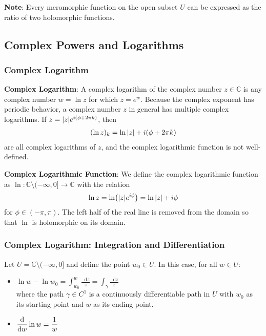 \documentclass[11pt, a4paper]{article}
\newcommand{\diff}{\mathop{}\!\mathrm{d}} %
\newcommand{\C}{\mathbb{C}} %
\begin{document}
\textbf{Note}: Every meromorphic function on the open subset $ U $ can be expressed as the ratio of two holomorphic functions.


\subsection{Complex Powers and Logarithms}

\subsubsection{Complex Logarithm}
\textbf{Complex Logarithm}: A complex logarithm of the complex number $ z \in \C $ is any complex number $ w = \ln z $ for which $ z = e^{w} $. Because the complex exponent has periodic behavior, a complex number $ z $ in general has multiple complex logarithms. If $ z = \abs{z}e^{i(\phi + 2\pi k)} $, then
\begin{align*}
	(\ln z)_k = \ln \abs{z} + i(\phi + 2\pi k)
\end{align*}
are all complex logarithms of $ z $, and the complex logarithmic function is not well-defined.

\textbf{Complex Logarithmic Function}: We define the complex logarithmic function as $ \ln : \C \setminus (-\infty, 0] \to \C $ with the relation
\begin{align*}
	\ln z = \ln (\abs{z}e^{i\phi}) = \ln \abs{z} + i \phi
\end{align*}
for $ \phi \in (-\pi, \pi) $. The left half of the real line is removed from the domain so that $ \ln $ is holomorphic on its domain.

\subsubsection{Complex Logarithm: Integration and Differentiation}
Let $ U = \C \setminus (-\infty, 0] $ and define the point $ w_0 \in U $. In this case, for all $ w \in U $:
\begin{itemize}
	\item $ \displaystyle{\ln w - \ln w_0 = \int_{w_0}^{w} \frac{\diff z}{z} = \int_{\gamma} \frac{\diff z}{z}} $\\
	where the path $ \gamma \in C^1 $ is a continuously differentiable path in $ U $ with $ w_0 $ as its starting point and $ w $ as its ending point.
	
	\item $ \displaystyle{\dv{}{w} \ln w = \frac{1}{w}} $
\end{itemize}
\end{document}
